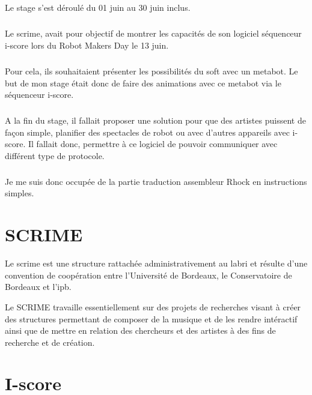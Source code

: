 \documentclass[10pt,a4paper]{report}
\begin{document}
\paragraph{}
Le stage s'est déroulé du 01 juin au 30 juin inclus.
\paragraph{}
Le \acrfull{scrime}, avait pour objectif de montrer les capacités de son logiciel séquenceur i-score lors du Robot Makers Day le 13 juin. 
\paragraph{}
Pour cela, ils souhaitaient présenter les possibilités du soft avec un metabot. Le but de mon stage était donc de faire des animations avec ce metabot via le séquenceur i-score. 
\paragraph{}
A la fin du stage, il fallait proposer une solution pour que des artistes puissent de façon simple, planifier des spectacles de robot ou avec d'autres appareils avec i-score. Il fallait donc, permettre à ce logiciel de pouvoir communiquer avec différent type de protocole.
\paragraph{}
Je me suis donc occupée de la partie traduction assembleur Rhock en instructions simples.



\chapter{SCRIME}
Le \acrshort{scrime} est une structure rattachée administrativement au  \acrfull{labri} et résulte d'une convention de coopération entre l'Université de Bordeaux, le Conservatoire de Bordeaux et l'\acrfull{ipb}.

Le SCRIME travaille essentiellement sur des projets de recherches visant à créer des structures permettant de composer de la musique et de les rendre intéractif ainsi que  de mettre en relation des chercheurs et des artistes à des fins de recherche et de création.

\chapter{I-score}
\paragraph{}
\end{document}
